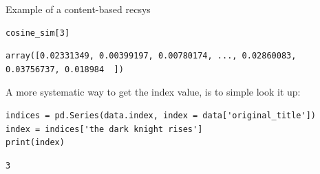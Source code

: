 \documentclass[handout]{beamer}
\begin{document}
\begin{frame}{Example of a content-based recsys}
\end{frame}


\begin{frame}[fragile]
\begin{verbatim}
cosine_sim[3]
\end{verbatim}
\pause
\begin{verbatim}
array([0.02331349, 0.00399197, 0.00780174, ..., 0.02860083, 0.03756737, 0.018984  ])
\end{verbatim}
\pause
A more systematic way to get the index value, is to simple look it up:
\begin{verbatim}
indices = pd.Series(data.index, index = data['original_title'])
index = indices['the dark knight rises']
print(index)
\end{verbatim}
\pause
\begin{verbatim}
3	
\end{verbatim}
\end{frame}
\end{document}
